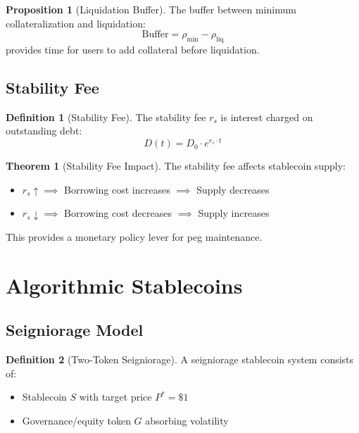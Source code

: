 \documentclass[11pt,a4paper]{article}
\theoremstyle{definition}
\newtheorem{definition}{Definition}
\newtheorem{theorem}{Theorem}
\newtheorem{proposition}{Proposition}
\begin{document}
\begin{proposition}[Liquidation Buffer]
The buffer between minimum collateralization and liquidation:
\begin{equation}
\text{Buffer} = \rho_{\min} - \rho_{\text{liq}}
\end{equation}
provides time for users to add collateral before liquidation.
\end{proposition}

\subsection{Stability Fee}

\begin{definition}[Stability Fee]
The stability fee $r_s$ is interest charged on outstanding debt:
\begin{equation}
D(t) = D_0 \cdot e^{r_s \cdot t}
\end{equation}
\end{definition}

\begin{theorem}[Stability Fee Impact]
The stability fee affects stablecoin supply:
\begin{itemize}
\item $r_s \uparrow \implies$ Borrowing cost increases $\implies$ Supply decreases
\item $r_s \downarrow \implies$ Borrowing cost decreases $\implies$ Supply increases
\end{itemize}
\end{theorem}

This provides a monetary policy lever for peg maintenance.

\section{Algorithmic Stablecoins}

\subsection{Seigniorage Model}

\begin{definition}[Two-Token Seigniorage]
A seigniorage stablecoin system consists of:
\begin{itemize}
\item Stablecoin $S$ with target price $P^* = \$1$
\item Governance/equity token $G$ absorbing volatility
\end{itemize}
\end{definition}
\end{document}
